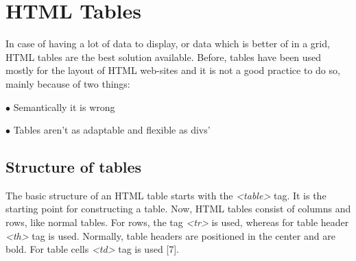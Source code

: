 %
%
% 
% 
% 


\chapter{HTML Tables}

\label{HTML5 Tables}

In case of having a lot of data to display, or data which is better of in a grid, HTML tables
are the best solution available. Before, tables have been used mostly for the layout of 
HTML web-sites and it is not a good practice to do so, mainly because of two things:
 

$\bullet$ Semantically it is wrong

$\bullet$ Tables aren't as adaptable and flexible as divs'

\section{Structure of tables}

The basic structure of an HTML table starts with the \textit{<table>} tag. It is the starting
point for constructing a table. Now, HTML tables consist of columns and rows, like normal
tables. For rows, the tag  \textit{<tr>} is used, whereas for table header \textit{<th>} tag
is used. Normally, table headers are positioned in the center and are bold. For table cells
\textit{<td>} tag is used [7]. 

